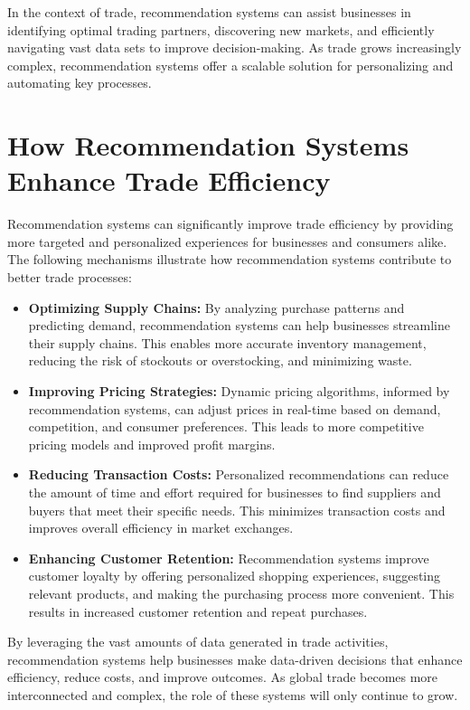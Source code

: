 \documentclass[10pt,twocolumn,twoside,slovak,a4paper]{article}
\begin{document}
In the context of trade, recommendation systems can assist businesses in identifying optimal trading partners, discovering new markets, and efficiently navigating vast data sets to improve decision-making. As trade grows increasingly complex, recommendation systems offer a scalable solution for personalizing and automating key processes.



\section{How Recommendation Systems Enhance Trade Efficiency}

Recommendation systems can significantly improve trade efficiency by providing more targeted and personalized experiences for businesses and consumers alike. The following mechanisms illustrate how recommendation systems contribute to better trade processes:

\begin{itemize}
    \item \textbf{Optimizing Supply Chains:} By analyzing purchase patterns and predicting demand, recommendation systems can help businesses streamline their supply chains. This enables more accurate inventory management, reducing the risk of stockouts or overstocking, and minimizing waste.
    
    \item \textbf{Improving Pricing Strategies:} Dynamic pricing algorithms, informed by recommendation systems, can adjust prices in real-time based on demand, competition, and consumer preferences. This leads to more competitive pricing models and improved profit margins.
    
    \item \textbf{Reducing Transaction Costs:} Personalized recommendations can reduce the amount of time and effort required for businesses to find suppliers and buyers that meet their specific needs. This minimizes transaction costs and improves overall efficiency in market exchanges.
    
    \item \textbf{Enhancing Customer Retention:} Recommendation systems improve customer loyalty by offering personalized shopping experiences, suggesting relevant products, and making the purchasing process more convenient. This results in increased customer retention and repeat purchases.
\end{itemize}

\noindent By leveraging the vast amounts of data generated in trade activities, recommendation systems help businesses make data-driven decisions that enhance efficiency, reduce costs, and improve outcomes. As global trade becomes more interconnected and complex, the role of these systems will only continue to grow.
\end{document}
